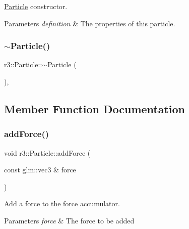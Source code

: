 \mbox{\hyperlink{classr3_1_1_particle}{Particle}} constructor. 


\begin{DoxyParams}{Parameters}
{\em definition} & The properties of this particle. \\
\hline
\end{DoxyParams}
\mbox{\label{classr3_1_1_particle_a235fd8a567a6ec911f26ca49a8045460}} 
\subsubsection{\texorpdfstring{$\sim$\+Particle()}{~Particle()}}
{\footnotesize\ttfamily r3\+::\+Particle\+::$\sim$\+Particle (\begin{DoxyParamCaption}{ }\end{DoxyParamCaption})\hspace{0.3cm}{\ttfamily [virtual]}, {\ttfamily [default]}}



\subsection{Member Function Documentation}
\mbox{\label{classr3_1_1_particle_a18bc9d9ded382879086eb2820ce787c9}} 
\subsubsection{\texorpdfstring{add\+Force()}{addForce()}}
{\footnotesize\ttfamily void r3\+::\+Particle\+::add\+Force (\begin{DoxyParamCaption}\item[{const glm\+::vec3 \&}]{force }\end{DoxyParamCaption})}



Add a force to the force accumulator. 


\begin{DoxyParams}{Parameters}
{\em force} & The force to be added \\
\hline
\end{DoxyParams}
\mbox{\label{classr3_1_1_particle_a1ba9a33fb4513cf79eb8bf4954ec6b97}} 
